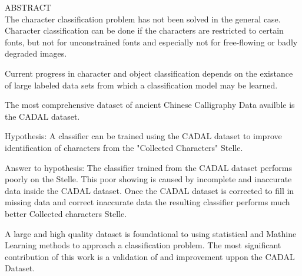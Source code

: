 ABSTRACT\\

The character classification problem has not been solved in the general case.  Character classification can be done if the characters are restricted to certain fonts, but not for unconstrained fonts and especially not for free-flowing or badly degraded images.

Current progress in character and object classification depends on the existance of large labeled data sets from which a classification model may be learned.

The most comprehensive dataset of ancient Chinese Calligraphy Data availble is the CADAL dataset.

Hypothesis:  A classifier can be trained using the CADAL dataset to improve identification of characters from the "Collected Characters" Stelle.

Answer to hypothesis:  The classifier trained from the CADAL dataset performs poorly on the Stelle.  This poor showing is caused by incomplete and inaccurate data inside the CADAL dataset.  Once the CADAL dataset is corrected to fill in missing data and correct inaccurate data the resulting classifier performs much better Collected characters Stelle.

A large and high quality dataset is foundational to using statistical and Mathine Learning methods to approach a classification problem.  The most significant contribution of this work is a validation of and improvement uppon the CADAL Dataset.

\newpage
